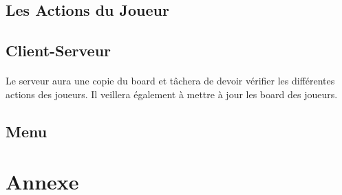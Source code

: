 \documentclass[10pt, a4paper]{article}
\begin{document}
\subsection{Les Actions du Joueur}

\subsection{Client-Serveur}
\paragraph{}Le serveur aura une copie du board et tâchera de devoir vérifier les différentes actions des joueurs. Il veillera également à mettre à jour les board des joueurs.

\subsection{Menu}

\section{Annexe}
\end{document}

